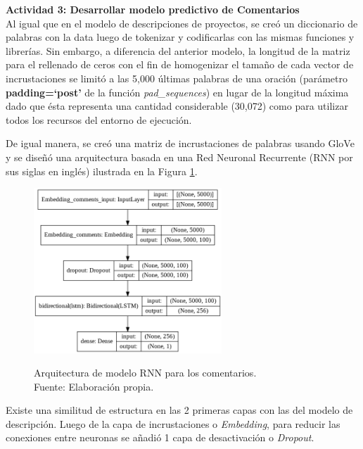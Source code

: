 \textbf{Actividad 3: Desarrollar modelo predictivo de Comentarios}
\\
Al igual que en el modelo de descripciones de proyectos, se creó un diccionario de palabras con la data luego de tokenizar y codificarlas con las mismas funciones y librerías. Sin embargo, a diferencia del anterior modelo, la longitud de la matriz para el rellenado de ceros con el fin de homogenizar el tamaño de cada vector de incrustaciones se limitó a las 5,000 últimas palabras de una oración (parámetro \textbf{padding=`post'} de la función \textit{pad\_sequences}) en lugar de la longitud máxima dado que ésta representa una cantidad considerable (30,072) como para utilizar todos los recursos del entorno de ejecución.

De igual manera, se creó una matriz de incrustaciones de palabras usando GloVe y se diseñó una arquitectura basada en una Red Neuronal Recurrente (RNN por sus siglas en inglés) ilustrada en la Figura \ref{4:fig36}.

\begin{figure}[!ht]
	\begin{center}
		\includegraphics[width=0.63\textwidth]{4/figures/model_rnn_comments.png}
		\caption[Arquitectura de modelo RNN para los comentarios]{Arquitectura de modelo RNN para los comentarios.\\
			Fuente: Elaboración propia.}
		\vspace{-0.5cm}
		\label{4:fig36}
	\end{center}
\end{figure}

Existe una similitud de estructura en las 2 primeras capas con las del modelo de descripción. Luego de la capa de incrustaciones o \textit{Embedding}, para reducir las conexiones entre neuronas se añadió 1 capa de desactivación o \textit{Dropout}.

